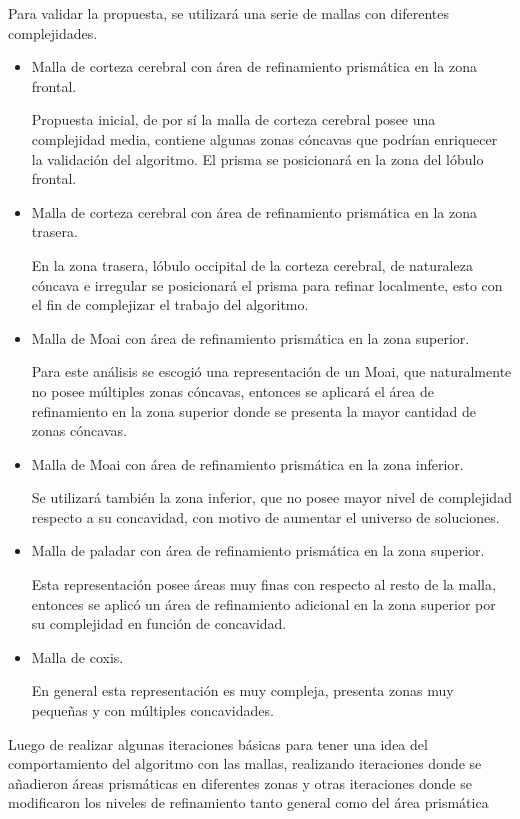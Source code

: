 Para validar la propuesta, se utilizará una serie de mallas con diferentes complejidades.
\begin{itemize}
    \item Malla de corteza cerebral con área de refinamiento prismática en la zona frontal.

        Propuesta inicial, de por sí la malla de corteza cerebral posee una complejidad media, contiene algunas zonas cóncavas que podrían enriquecer la validación del algoritmo. El prisma se posicionará en la zona del lóbulo frontal.
    \item Malla de corteza cerebral con área de refinamiento prismática en la zona trasera.

        En la zona trasera, lóbulo occipital de la corteza cerebral, de naturaleza cóncava e irregular se posicionará el prisma para refinar localmente, esto con el fin de complejizar el trabajo del algoritmo.
    \item Malla de Moai con área de refinamiento prismática en la zona superior.

        Para este análisis se escogió una representación de un Moai, que naturalmente no posee múltiples zonas cóncavas, entonces se aplicará el área de refinamiento en la zona superior donde se presenta la mayor cantidad de zonas cóncavas. 
    \item Malla de Moai con área de refinamiento prismática en la zona inferior.

        Se utilizará también la zona inferior, que no posee mayor nivel de complejidad respecto a su concavidad, con motivo de aumentar el universo de soluciones.
    \item Malla de paladar con área de refinamiento prismática en la zona superior.

        Esta representación posee áreas muy finas con respecto al resto de la malla, entonces se aplicó un área de refinamiento adicional en la zona superior por su complejidad en función de concavidad.
    \item Malla de coxis.

        En general esta representación es muy compleja, presenta zonas muy pequeñas y con múltiples concavidades.
\end{itemize}

Luego de realizar algunas iteraciones básicas para tener una idea del comportamiento del algoritmo con las mallas, realizando iteraciones donde se añadieron áreas prismáticas en diferentes zonas y otras iteraciones donde se modificaron los niveles de refinamiento tanto general como del área prismática

